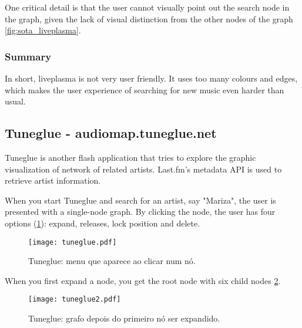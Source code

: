 One critical detail is that the user cannot visually point out the search node in the graph, given the lack of visual distinction from the other nodes of the graph \ref{fig:sota_liveplasma}.



\subsubsection{Summary} %
\label{ssub:liveplasma_summary}

In short, liveplasma is not very user friendly. 
It uses too many colours and edges, which makes the user experience of searching for new music even harder than usual.



\subsection{Tuneglue - audiomap.tuneglue.net} %
\label{sub:tuneglue}

Tuneglue is another flash application that tries to explore the graphic visualization of network of related artists.
Last.fm's metadata API is used to retrieve artist information.

When you start Tuneglue and search for an artist, say "Mariza", the user is presented with a single-node graph.
By clicking the node, the user has four options (\ref{fig:sota_tuneglue}): expand, releases, lock position and delete.


\begin{figure}[bt]
  \begin{center}
    \texttt{[image: tuneglue.pdf]}
  \end{center}
  \caption{Tuneglue: menu que aparece ao clicar num nó.}
  \label{fig:sota_tuneglue}
\end{figure}

When you first expand a node, you get the root node with six child nodes \ref{fig:sota_tuneglue2}.

\begin{figure}[tb]
  \begin{center}
    \texttt{[image: tuneglue2.pdf]}
  \end{center}
  \caption{Tuneglue: grafo depois do primeiro nó ser expandido.}
  \label{fig:sota_tuneglue2}
\end{figure}

